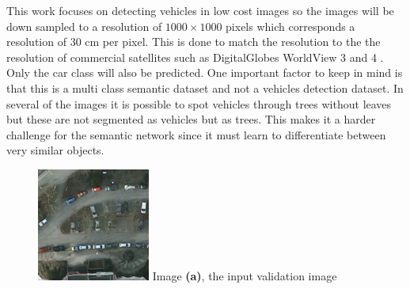 \documentclass{kththesis}
\begin{document}
This work focuses on detecting vehicles in low cost images so the images will be down sampled to a resolution of $1000 \times 1000$ pixels which corresponds a resolution of 30 cm per pixel. This is done to match the resolution to the the resolution of commercial satellites such as DigitalGlobes WorldView 3 and 4 \cite{noauthor_worldview-3_nodate}. Only the car class will also be predicted. One important factor to keep in mind is that this is a multi class semantic dataset and not a vehicles detection dataset. In several of the images it is possible to spot vehicles through trees without leaves but these are not segmented as vehicles but as trees. This makes it a harder challenge for the semantic network since it must learn to differentiate between very similar objects.
\begin{figure}[H]
  \includegraphics[width=\linewidth]{trees}
  Image \textbf{(a)}, the input validation image
\endminipage\hfill
{}

\end{figure}
\end{document}
